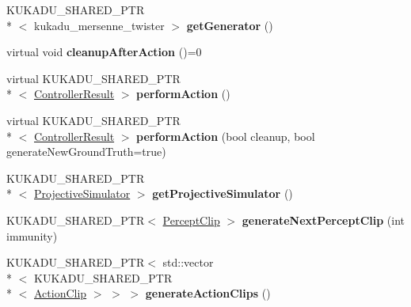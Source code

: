 \begin{DoxyCompactItemize}
\item 
\hypertarget{classkukadu_1_1ComplexController_a67806f5dd6b35f6f46b78556d26b945b}{K\-U\-K\-A\-D\-U\-\_\-\-S\-H\-A\-R\-E\-D\-\_\-\-P\-T\-R\\*
$<$ kukadu\-\_\-mersenne\-\_\-twister $>$ {\bfseries get\-Generator} ()}\label{classkukadu_1_1ComplexController_a67806f5dd6b35f6f46b78556d26b945b}

\item 
\hypertarget{classkukadu_1_1ComplexController_af43a1a1724f8eb2d37fbc65c785eca93}{virtual void {\bfseries cleanup\-After\-Action} ()=0}\label{classkukadu_1_1ComplexController_af43a1a1724f8eb2d37fbc65c785eca93}

\item 
\hypertarget{classkukadu_1_1ComplexController_aab69d37e0130f8f33627b3d3ff1426cb}{virtual K\-U\-K\-A\-D\-U\-\_\-\-S\-H\-A\-R\-E\-D\-\_\-\-P\-T\-R\\*
$<$ \hyperlink{classkukadu_1_1ControllerResult}{Controller\-Result} $>$ {\bfseries perform\-Action} ()}\label{classkukadu_1_1ComplexController_aab69d37e0130f8f33627b3d3ff1426cb}

\item 
\hypertarget{classkukadu_1_1ComplexController_ac07b97409084ee284bd19e9d2ebd3aa4}{virtual K\-U\-K\-A\-D\-U\-\_\-\-S\-H\-A\-R\-E\-D\-\_\-\-P\-T\-R\\*
$<$ \hyperlink{classkukadu_1_1ControllerResult}{Controller\-Result} $>$ {\bfseries perform\-Action} (bool cleanup, bool generate\-New\-Ground\-Truth=true)}\label{classkukadu_1_1ComplexController_ac07b97409084ee284bd19e9d2ebd3aa4}

\item 
\hypertarget{classkukadu_1_1ComplexController_a23eaaa60d29891e9f62cea576d31d6e6}{K\-U\-K\-A\-D\-U\-\_\-\-S\-H\-A\-R\-E\-D\-\_\-\-P\-T\-R\\*
$<$ \hyperlink{classkukadu_1_1ProjectiveSimulator}{Projective\-Simulator} $>$ {\bfseries get\-Projective\-Simulator} ()}\label{classkukadu_1_1ComplexController_a23eaaa60d29891e9f62cea576d31d6e6}

\item 
\hypertarget{classkukadu_1_1ComplexController_ac986dad743a543955c0fb1871cc675d4}{K\-U\-K\-A\-D\-U\-\_\-\-S\-H\-A\-R\-E\-D\-\_\-\-P\-T\-R$<$ \hyperlink{classkukadu_1_1PerceptClip}{Percept\-Clip} $>$ {\bfseries generate\-Next\-Percept\-Clip} (int immunity)}\label{classkukadu_1_1ComplexController_ac986dad743a543955c0fb1871cc675d4}

\item 
\hypertarget{classkukadu_1_1ComplexController_af8e2a09a2b074fceab2765a8f710ce78}{K\-U\-K\-A\-D\-U\-\_\-\-S\-H\-A\-R\-E\-D\-\_\-\-P\-T\-R$<$ std\-::vector\\*
$<$ K\-U\-K\-A\-D\-U\-\_\-\-S\-H\-A\-R\-E\-D\-\_\-\-P\-T\-R\\*
$<$ \hyperlink{classkukadu_1_1ActionClip}{Action\-Clip} $>$ $>$ $>$ {\bfseries generate\-Action\-Clips} ()}\label{classkukadu_1_1ComplexController_af8e2a09a2b074fceab2765a8f710ce78}


\end{DoxyCompactItemize}
